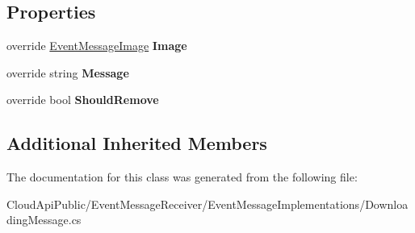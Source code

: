\subsection*{Properties}
\begin{DoxyCompactItemize}
\item 
\hypertarget{class_cloud_api_public_1_1_event_message_receiver_1_1_downloading_message_a671a0306f7eaea89889ff83e2eeb9dee}{override \hyperlink{namespace_cloud_api_public_1_1_static_aefcc1e7e1c81366ec3f6affd41c1f817}{Event\-Message\-Image} {\bfseries Image}}\label{class_cloud_api_public_1_1_event_message_receiver_1_1_downloading_message_a671a0306f7eaea89889ff83e2eeb9dee}

\item 
\hypertarget{class_cloud_api_public_1_1_event_message_receiver_1_1_downloading_message_a7a190dadcbff43246515dae3293854ed}{override string {\bfseries Message}}\label{class_cloud_api_public_1_1_event_message_receiver_1_1_downloading_message_a7a190dadcbff43246515dae3293854ed}

\item 
\hypertarget{class_cloud_api_public_1_1_event_message_receiver_1_1_downloading_message_abc8f37b597879baf61b6d10801e67e3f}{override bool {\bfseries Should\-Remove}}\label{class_cloud_api_public_1_1_event_message_receiver_1_1_downloading_message_abc8f37b597879baf61b6d10801e67e3f}

\end{DoxyCompactItemize}
\subsection*{Additional Inherited Members}


The documentation for this class was generated from the following file\-:\begin{DoxyCompactItemize}
\item 
Cloud\-Api\-Public/\-Event\-Message\-Receiver/\-Event\-Message\-Implementations/Downloading\-Message.\-cs\end{DoxyCompactItemize}
